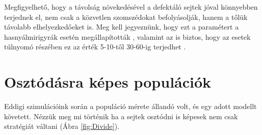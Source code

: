 Megfigyelhető, hogy a távolság növekedésével a defektáló sejtek jóval könnyebben terjednek el, nem csak a közvetlen szomszédokat befolyásolják, hanem a tőlük távolabb elhelyezkedőeket is. Meg kell jegyeznünk, hogy ezt a paramétert a hasnyálmirigyrák esetén megállapították \cite{archetti2015heterogeneity}, valamint az is biztos, hogy az esetek túlnyomó részében ez az érték 5-10-től 30-60-ig terjedhet \cite{archetti2016cooperation}.
\section{Osztódásra képes populációk}

Eddigi szimulációink során a populáció mérete állandó volt, és egy adott modellt követett. Nézzük meg mi történik ha a sejtek osztódni is képesek nem csak stratégiát váltani (Ábra \ref{fig:Divide}). 


